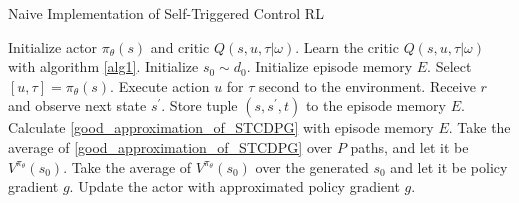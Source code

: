 \documentclass[english, dvipdfmx]{ampmt}             %
\begin{document}
\begin{algorithm}                      
\caption{Naive Implementation of Self-Triggered Control RL}         
\label{alg2}                          
\begin{algorithmic}                  
    \STATE Initialize actor $\pi_{\theta}(s)$ and critic $Q(s,u,\tau|\omega)$.
    \STATE Learn the critic $Q(s,u,\tau|\omega)$ with algorithm \ref{alg1}.
            \STATE Initialize $s_0\sim d_0$.
            \STATE Initialize episode memory $E$.
                \STATE Select $[u, \tau] = \pi_{\theta}(s)$.
                \STATE Execute action $u$ for $\tau$ second to the environment.
                \STATE Receive $r$ and observe next state $s^{\prime}$.
                \STATE Store tuple $(s, s^{\prime}, t)$ to the episode memory $E$.
            \ENDWHILE
            \STATE Calculate \eqref{good_approximation_of_STCDPG} with episode memory $E$.
        \ENDFOR
        \STATE Take the average of \eqref{good_approximation_of_STCDPG} over $P$ paths, and let it be $V^{\pi_{\theta}}(s_0)$.
        \ENDFOR
    \ENDFOR
    \STATE Take the average of $V^{\pi_{\theta}}(s_0)$ over the generated $s_0$ and let it be policy gradient $g$.
    \STATE Update the actor with approximated policy gradient $g$.
   \end{algorithmic}
\end{algorithm}
\end{document}
